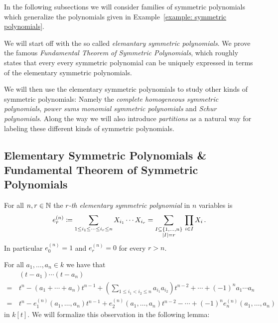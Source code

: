 \begin{fluff}
  In the following subsections we will consider families of symmetric polynomials which generalize the polynomials given in Example~\ref{example: symmetric polynomials}.
  
  We will start off with the so called \emph{elemantary symmetric polynomials}.
  We prove the famous \emph{Fundamental Theorem of Symmetric Polynomials}, which roughly states that every every symmetric polynomial can be uniquely expressed in terms of the elementary symmetric polynomials.
  
  We will then use the elementary symmetric polynomials to study other kinds of symmetric polynomials:
  Namely the \emph{complete homogeneous symmetric polynomials}, \emph{power sums} \emph{monomial symmetric polynomials} and \emph{Schur polynomials}.
  Along the way we will also introduce \emph{partitions} as a natural way for labeling these different kinds of symmetric polynomials.
\end{fluff}





\subsection{Elementary Symmetric Polynomials \& Fundamental Theorem of Symmetric Polynomials}


\begin{definition}
  For all $n, r \in \mathbb{N}$ the \emph{$r$-th elementary symmetric polynomial} in $n$ variables is
  \[
              e^{(n)}_r
    \coloneqq  \sum_{1 \leq i_1 \leq \dotsb \leq i_r \leq n} X_{i_1} \dotsm X_{i_r}
    =         \sum_{\substack{I \subseteq \{1, \dotsc, n\} \\ |I| = r}} \, \prod_{i \in I} X_i \,.
  \]
  In particular $e^{(n)}_0 = 1$ and $e^{(n)}_r = 0$ for every $r > n$.
\end{definition}


\begin{fluff}
  For all $a_1, \dotsc, a_n \in k$ we have that
  \begin{align*}
     &\, (t-a_1) \dotsm (t-a_n) \\
    =&\, t^n  - (a_1 + \dotsb + a_n) t^{n-1}
              + \left( \sum_{1 \leq i_1 < i_2 \leq n} a_{i_1} a_{i_2} \right) t^{n-2}
              + \dotsb
              + (-1)^n a_1 \dotsm a_n \\ 
    =&\,    t^n
          - e^{(n)}_1(a_1, \dotsc, a_n) t^{n-1}
          + e^{(n)}_2(a_1, \dotsc, a_n) t^{n-2}
          - \dotsb
          + (-1)^n e^{(n)}_n(a_1, \dotsc, a_n)
  \end{align*}
  in $k[t]$.
  We will formalize this observation in the following lemma:
\end{fluff}


